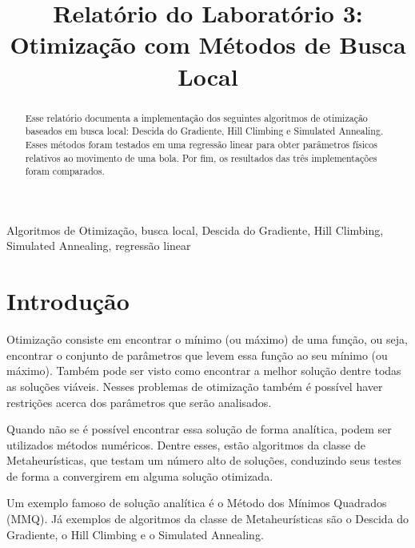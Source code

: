 \documentclass[conference]{IEEEtran}
\begin{document}
\title{Relatório do Laboratório 3: \\ Otimização com Métodos de Busca Local\\
}

\author{
}

\maketitle

\begin{abstract}
Esse relatório documenta a implementação dos seguintes algoritmos de otimização baseados em busca local: Descida do Gradiente, Hill Climbing e Simulated Annealing. Esses métodos foram testados em uma regressão linear para obter parâmetros físicos relativos ao movimento de uma bola. Por fim, os resultados das três implementações foram comparados.
\end{abstract}

\begin{IEEEkeywords}
Algoritmos de Otimização, busca local, Descida do Gradiente, Hill Climbing, Simulated Annealing, regressão linear
\end{IEEEkeywords}

\section{Introdução}
Otimização consiste em encontrar o mínimo (ou máximo) de uma função, ou seja, encontrar o conjunto de parâmetros que levem essa função ao seu mínimo (ou máximo). Também pode ser visto como encontrar a melhor solução dentre todas as soluções viáveis. Nesses problemas de otimização também é possível haver restrições acerca dos parâmetros que serão analisados.

Quando não se é possível encontrar essa solução de forma analítica, podem ser utilizados métodos numéricos. Dentre esses, estão algoritmos da classe de Metaheurísticas, que testam um número alto de soluções, conduzindo seus testes de forma a convergirem em alguma solução otimizada. 

Um exemplo famoso de solução analítica é o Método dos Mínimos Quadrados (MMQ). Já exemplos de algoritmos da classe de Metaheurísticas são o Descida do Gradiente, o Hill Climbing e o Simulated Annealing. 
\end{document}

